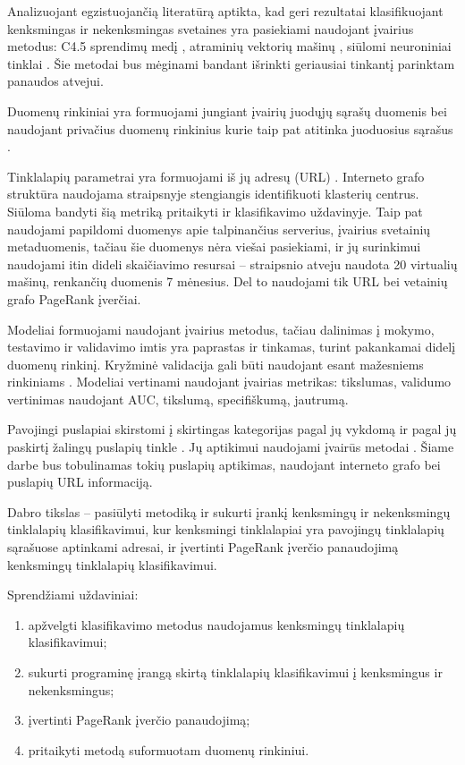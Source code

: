 
Analizuojant egzistuojančią literatūrą aptikta, kad geri rezultatai klasifikuojant kenksmingas ir nekenksmingas svetaines yra pasiekiami naudojant įvairius metodus: C4.5 sprendimų medį \cite{trees}, atraminių vektorių mašinų \cite{comp}, siūlomi neuroniniai tinklai \cite{trees}. Šie metodai bus mėginami bandant išrinkti geriausiai tinkantį parinktam panaudos atvejui.

Duomenų rinkiniai yra formuojami jungiant įvairių juodųjų sąrašų duomenis bei naudojant privačius duomenų rinkinius kurie taip pat atitinka juoduosius sąrašus \cite{trees, comp, webcop}.

Tinklalapių parametrai yra formuojami iš jų adresų (URL) \cite{trees, comp}. Interneto grafo struktūra naudojama straipsnyje \cite{linchpins} stengiangis identifikuoti klasterių centrus. Siūloma bandyti šią metriką pritaikyti ir klasifikavimo uždavinyje. Taip pat naudojami papildomi duomenys apie talpinančius serverius, įvairius svetainių metaduomenis, tačiau šie duomenys nėra viešai pasiekiami, ir jų surinkimui naudojami itin dideli skaičiavimo resursai -- \cite{linchpins} straipsnio atveju naudota 20 virtualių mašinų, renkančių duomenis 7 mėnesius. Del to naudojami tik URL bei vetainių grafo PageRank įverčiai.

Modeliai formuojami naudojant įvairius metodus, tačiau dalinimas į mokymo, testavimo ir validavimo imtis yra paprastas ir tinkamas, turint pakankamai didelį duomenų rinkinį. Kryžminė validacija gali būti naudojant esant mažesniems rinkiniams \cite{trees}. Modeliai vertinami naudojant įvairias metrikas: tikslumas, validumo vertinimas naudojant AUC, tikslumą, specifiškumą, jautrumą.

\newpage
{}
Pavojingi puslapiai skirstomi į skirtingas kategorijas pagal jų vykdomą \cite{tax} ir pagal jų paskirtį žalingų puslapių tinkle \cite{linchpins}. Jų aptikimui naudojami įvairūs metodai \cite{comp}. Šiame darbe bus tobulinamas tokių puslapių aptikimas, naudojant interneto grafo bei puslapių URL informaciją.

Dabro tikslas -- pasiūlyti metodiką ir sukurti įrankį kenksmingų ir nekenksmingų tinklalapių klasifikavimui, kur kenksmingi tinklalapiai yra pavojingų tinklalapių sąrašuose aptinkami adresai, ir įvertinti PageRank įverčio panaudojimą kenksmingų tinklalapių klasifikavimui.

Sprendžiami uždaviniai:
\begin{enumerate}
    \item apžvelgti klasifikavimo metodus naudojamus kenksmingų tinklalapių klasifikavimui;
    \item sukurti programinę įrangą skirtą tinklalapių klasifikavimui į kenksmingus ir nekenksmingus;
    \item įvertinti PageRank įverčio panaudojimą;
    \item pritaikyti metodą suformuotam duomenų rinkiniui.
\end{enumerate}